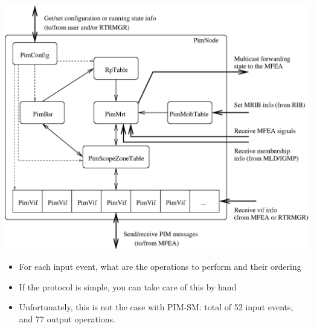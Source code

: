 \documentclass[landscape]{icsislides}
\begin{document}
\begin{slide}

\begin{center}
  \includegraphics[width=6.0in]{figs/pim_design_overview}
\end{center}

\end{slide}

\begin{slide}

\begin{itemize}

  \item For each input event, what are the operations to perform and their
  ordering

  \item If the protocol is simple, you can take care of this by hand

  \item Unfortunately, this is not the case with PIM-SM:
  total of 52 input events, and 77 output operations.   

\end{itemize}

\end{slide}
\end{document}
